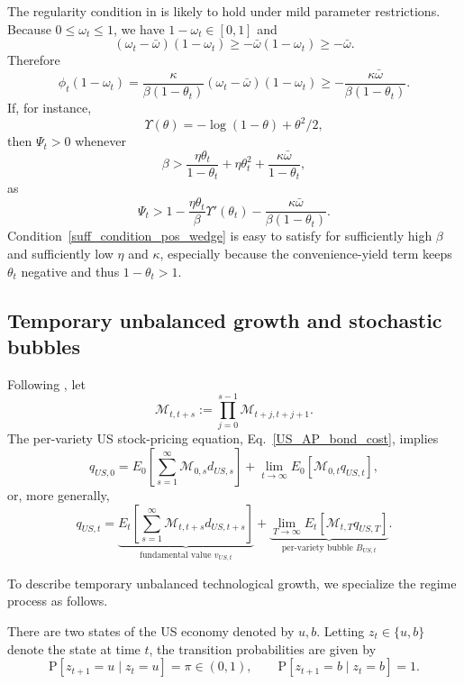 \documentclass{article}
\begin{document}
The regularity condition in  is likely to hold under mild parameter restrictions. Because $0\le \omega_t\le 1$, we have $1-\omega_t\in[0,1]$ and
\[
(\omega_t-\bar\omega)(1-\omega_t)
\ge -\bar\omega(1-\omega_t)
\ge -\bar\omega.
\]
Therefore
\[
\phi_t(1-\omega_t)
=
\frac{\kappa}{\beta(1-\theta_t)}(\omega_t-\bar\omega)(1-\omega_t)
\ge
-\frac{\kappa\bar\omega}{\beta(1-\theta_t)}.
\]
If, for instance,
\[
\Upsilon(\theta)=-\log(1-\theta)+\theta^2/2,
\]
then $\Psi_t>0$ whenever
\begin{equation}\label{suff_condition_pos_wedge}
\beta > \frac{\eta\theta_t}{1-\theta_t}+\eta\theta_t^2+\frac{\kappa\bar\omega}{1-\theta_t},
\end{equation}
as
\[
\Psi_t > 1-\frac{\eta\theta_t}{\beta}\Upsilon'(\theta_t)-\frac{\kappa\bar\omega}{\beta(1-\theta_t)}.
\]
Condition~\eqref{suff_condition_pos_wedge} is easy to satisfy for sufficiently high $\beta$ and sufficiently low $\eta$ and $\kappa$, especially because the convenience-yield term keeps $\theta_t$ negative and thus $1-\theta_t>1$.

\subsection{Temporary unbalanced growth and stochastic bubbles}

Following \citet{hirano2025technological}, let
\[
\mathcal M_{t,t+s}:=\prod_{j=0}^{s-1}\mathcal M_{t+j,t+j+1}.
\]
The per-variety US stock-pricing equation, Eq.~\eqref{US_AP_bond_cost}, implies
\[
q_{US,0}
=
E_0\!\left[\sum_{s=1}^{\infty}\mathcal M_{0,s}d_{US,s}\right]
+
\lim_{t\to\infty}E_0\!\left[\mathcal M_{0,t}q_{US,t}\right],
\]
or, more generally,
\[
q_{US,t}
=
\underbrace{E_t\!\left[\sum_{s=1}^{\infty}\mathcal M_{t,t+s}d_{US,t+s}\right]}_{\text{fundamental value }v_{US,t}}
+
\underbrace{\lim_{T\to\infty}E_t\!\left[\mathcal M_{t,T}q_{US,T}\right]}_{\text{per-variety bubble }B_{US,t}}.
\]

To describe temporary unbalanced technological growth, we specialize the regime process as follows.

\begin{ass}\label{ass_regime_switch}
There are two states of the US economy denoted by $u, b$. Letting $z_t\in\{u,b\}$ denote the state at time $t$, the transition probabilities are given by
\[
\mathrm{P}[z_{t+1}=u\mid z_t=u]=\pi\in(0,1),
\qquad
\mathrm{P}[z_{t+1}=b\mid z_t=b]=1.
\]
\end{ass}
\end{document}
